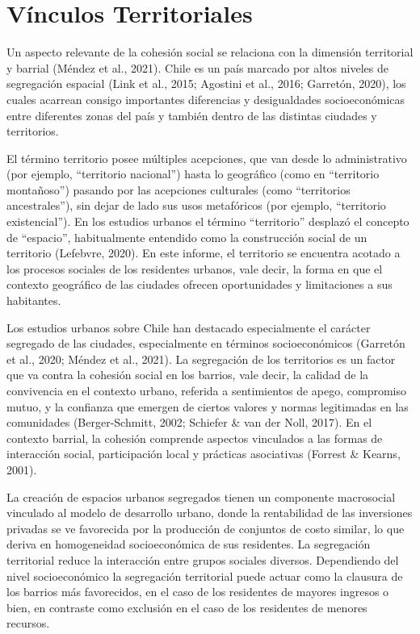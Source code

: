 \documentclass[
  12pt,
]{book}
\begin{document}
\hypertarget{vuxednculos-territoriales}{%
\section{Vínculos Territoriales}\label{vuxednculos-territoriales}}

Un aspecto relevante de la cohesión social se relaciona con la dimensión territorial y barrial (Méndez et al., 2021). Chile es un país marcado por altos niveles de segregación espacial (Link et al., 2015; Agostini et al., 2016; Garretón, 2020), los cuales acarrean consigo importantes diferencias y desigualdades socioeconómicas entre diferentes zonas del país y también dentro de las distintas ciudades y territorios.

El término territorio posee múltiples acepciones, que van desde lo administrativo (por ejemplo, ``territorio nacional'') hasta lo geográfico (como en ``territorio montañoso'') pasando por las acepciones culturales (como ``territorios ancestrales''), sin dejar de lado sus usos metafóricos (por ejemplo, ``territorio existencial''). En los estudios urbanos el término ``territorio'' desplazó el concepto de ``espacio'', habitualmente entendido como la construcción social de un territorio (Lefebvre, 2020). En este informe, el territorio se encuentra acotado a los procesos sociales de los residentes urbanos, vale decir, la forma en que el contexto geográfico de las ciudades ofrecen oportunidades y limitaciones a sus habitantes.

Los estudios urbanos sobre Chile han destacado especialmente el carácter segregado de las ciudades, especialmente en términos socioeconómicos (Garretón et al., 2020; Méndez et al., 2021). La segregación de los territorios es un factor que va contra la cohesión social en los barrios, vale decir, la calidad de la convivencia en el contexto urbano, referida a sentimientos de apego, compromiso mutuo, y la confianza que emergen de ciertos valores y normas legitimadas en las comunidades (Berger-Schmitt, 2002; Schiefer \& van der Noll, 2017). En el contexto barrial, la cohesión comprende aspectos vinculados a las formas de interacción social, participación local y prácticas asociativas (Forrest \& Kearns, 2001).

La creación de espacios urbanos segregados tienen un componente macrosocial vinculado al modelo de desarrollo urbano, donde la rentabilidad de las inversiones privadas se ve favorecida por la producción de conjuntos de costo similar, lo que deriva en homogeneidad socioeconómica de sus residentes. La segregación territorial reduce la interacción entre grupos sociales diversos. Dependiendo del nivel socioeconómico la segregación territorial puede actuar como la clausura de los barrios más favorecidos, en el caso de los residentes de mayores ingresos o bien, en contraste como exclusión en el caso de los residentes de menores recursos.
\end{document}
